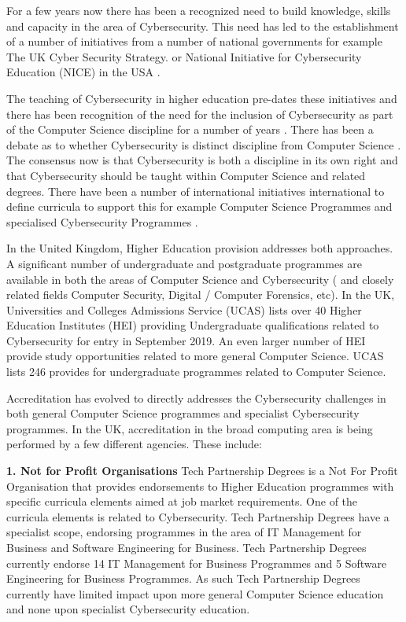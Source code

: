 \documentclass[sigconf,anonymous]{acmart}
\begin{document}
For a few years now there has been a recognized need to build knowledge, skills and capacity in the area of Cybersecurity. This need has led to the establishment of a number of initiatives from a number of national governments for example The UK Cyber Security Strategy. \cite{UKCabinetOffice} or National Initiative for Cybersecurity Education (NICE) in the USA \cite{NICE}. 

The teaching of Cybersecurity in higher education pre-dates these initiatives and there has been recognition of the need for the inclusion of Cybersecurity as part of the Computer Science discipline for a number of years \cite{Hentea2006}. There has  been a debate as to whether Cybersecurity is distinct discipline from Computer Science \cite{McGettreick2013}. The consensus now is that Cybersecurity is both a discipline in its own right and that Cybersecurity should be taught within Computer Science and related degrees. There have been a number of international initiatives international to define curricula to support this for example Computer Science Programmes  \cite{ACM2013a} and specialised Cybersecurity Programmes \cite{ACMIEEEAISSIGSECIFIP}.

In the United Kingdom, Higher Education provision addresses both approaches. A significant number of undergraduate and postgraduate programmes are available in both the areas of Computer Science and Cybersecurity ( and closely related fields Computer Security, Digital / Computer Forensics, etc). In the UK, Universities and Colleges Admissions Service (UCAS) lists over 40 Higher Education Institutes (HEI) providing Undergraduate qualifications related to Cybersecurity for entry in September 2019. An even larger number of HEI provide study opportunities related to more general Computer Science. UCAS lists 246 provides for undergraduate programmes related to Computer Science. 

Accreditation has evolved to directly addresses the Cybersecurity challenges in both general Computer Science programmes and specialist Cybersecurity programmes. In the UK, accreditation in the broad computing area is being performed by a few different agencies. These include:

\textbf{1. Not for Profit Organisations}
Tech Partnership Degrees is a Not For Profit Organisation that provides endorsements to Higher Education programmes with specific curricula elements aimed at job market requirements. One of the curricula elements is related to Cybersecurity. Tech Partnership Degrees have a specialist scope, endorsing programmes in the area of IT Management for Business and Software Engineering for Business.  Tech Partnership Degrees currently endorse 14 IT Management for Business Programmes and 5 Software Engineering for Business Programmes. As such Tech Partnership Degrees currently have limited impact upon more general Computer Science education and none upon specialist Cybersecurity education. 
\end{document}
